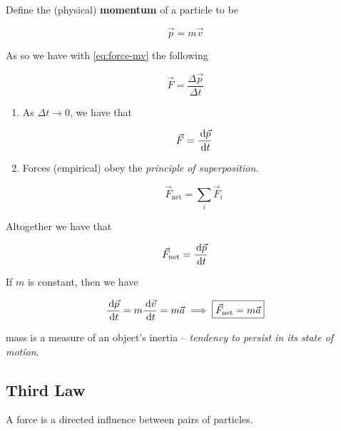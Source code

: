 \begin{definition}
	Define the (physical) \textbf{momentum} of a particle to be

	\begin{equation}
		\vec p = m \vec v
	\end{equation}
\end{definition}

As so we have with \cref*{eq:force-mv} the following

\begin{equation}
	\vec F = \frac{\Delta \vec p}{\Delta t}
\end{equation}

\begin{enumerate}
	\item As $\Delta t \to 0$, we have that
	
	\begin{equation}
		\vec F = \frac{\D \vec p}{\D t}
	\end{equation}

	\item Forces (empirical) obey the \textit{principle of superposition}.

	\begin{equation}
		\vec F_\mathrm{net} = \sum_i \vec F_i
	\end{equation}
\end{enumerate}

Altogether we have that

\begin{equation}
	\vec F_\mathrm{net} = \frac{\D \vec p}{\D t}
\end{equation}

If $m$ is constant, then we have

\begin{equation}
	\frac{\D \vec p}{\D t} = m \frac{\D \vec v}{\D t} = m \vec a \implies \boxed{\vec F_\mathrm{net} = m \vec a}
\end{equation}

mass is a measure of an object's inertia -- \textit{tendency to persist in its state of motion}.

\subsection{Third Law}

\begin{definition}
	A force is a directed influence between pairs of particles.
\end{definition}

